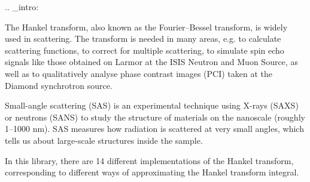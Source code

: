 .. \+\_\+intro\+:

The Hankel transform, also known as the Fourier–\+Bessel transform, is widely used in scattering. The transform is needed in many areas, e.\+g. to calculate scattering functions, to correct for multiple scattering, to simulate spin echo signals like those obtained on Larmor at the ISIS Neutron and Muon Source, as well as to qualitatively analyse phase contrast images (PCI) taken at the Diamond synchrotron source.

Small-\/angle scattering (SAS) is an experimental technique using X-\/rays (SAXS) or neutrons (SANS) to study the structure of materials on the nanoscale (roughly 1–1000 nm). SAS measures how radiation is scattered at very small angles, which tells us about large-\/scale structures inside the sample.

In this library, there are 14 different implementations of the Hankel transform, corresponding to different ways of approximating the Hankel transform integral.

